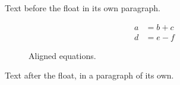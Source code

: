 \documentclass[12pt]{article}
\begin{document}
Text before the float in its own paragraph.

\begin{figure}[h]
\begin{align*}
a &= b + c\\
d &= e - f
\end{align*}
\caption{Aligned equations.}
\end{figure}

Text after the float, in a paragraph of its own.
\end{document}
